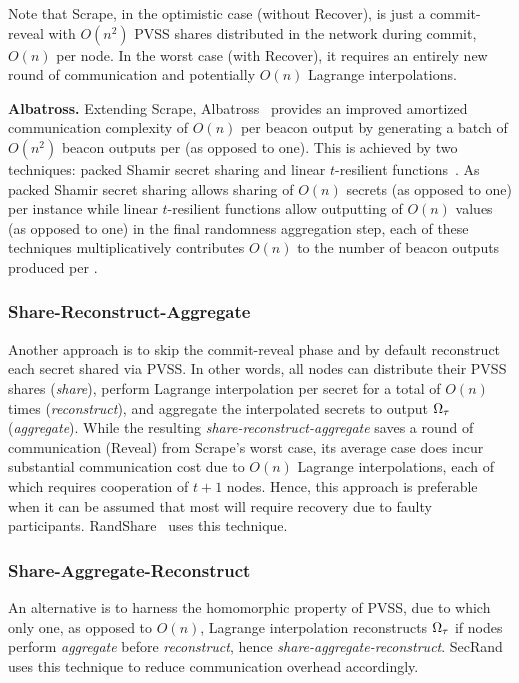 Note that Scrape, in the optimistic case (without Recover), is just a commit-reveal with $O(n^2)$ PVSS shares distributed in the network during commit, $O(n)$ per node. In the worst case (with Recover), it requires an entirely new round of communication and potentially $O(n)$ Lagrange interpolations.

\noindent\textbf{Albatross.} Extending Scrape, Albatross~\cite{cascudo2020albatross} provides an improved amortized communication complexity of $O(n)$ per beacon output by generating a batch of $O(n^2)$ beacon outputs per \epoch (as opposed to one).
This is achieved by two techniques: packed Shamir secret sharing and linear $t$-resilient functions~\cite{cascudo2020albatross}.
As packed Shamir secret sharing allows sharing of $O(n)$ secrets (as opposed to one) per instance while linear $t$-resilient functions allow outputting of $O(n)$ values (as opposed to one) in the final randomness aggregation step, each of these techniques multiplicatively contributes $O(n)$ to the number of beacon outputs produced per \epoch.

\subsubsection{Share-Reconstruct-Aggregate}
Another approach is to skip the commit-reveal phase and by default reconstruct each secret shared via PVSS. In other words, all nodes can distribute their PVSS shares (\textit{share}), perform Lagrange interpolation per secret for a total of $O(n)$ times (\textit{reconstruct}), and aggregate the interpolated secrets to output $\Omega_\tau$ (\textit{aggregate}). While the resulting \textit{share-reconstruct-aggregate} saves a round of communication (Reveal) from Scrape's worst case, its average case does incur substantial communication cost due to $O(n)$ Lagrange interpolations, each of which requires cooperation of $t + 1$ nodes. Hence, this approach is preferable when it can be assumed that most \epochs will require recovery due to faulty participants. RandShare~\cite{syta2017scalable} uses this technique.

\subsubsection{Share-Aggregate-Reconstruct}
An alternative is to harness the homomorphic property of PVSS, due to which only one, as opposed to $O(n)$, Lagrange interpolation reconstructs $\Omega_\tau$ if nodes perform \textit{aggregate} before \textit{reconstruct}, hence \textit{share-aggregate-reconstruct}. SecRand~\cite{guo2020secRand} uses this technique to reduce communication overhead accordingly.

